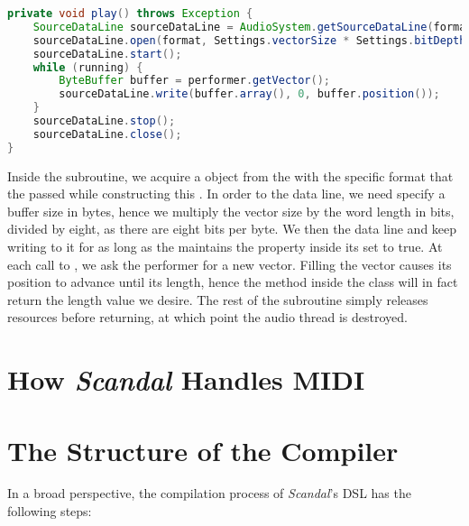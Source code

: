 \begin{lstlisting}[language=Java,caption={Writing buffers of audio data inside the \il{play} subroutine.},label={alg:play}]
private void play() throws Exception {
	SourceDataLine sourceDataLine = AudioSystem.getSourceDataLine(format);
	sourceDataLine.open(format, Settings.vectorSize * Settings.bitDepth / 8);
	sourceDataLine.start();
	while (running) {
		ByteBuffer buffer = performer.getVector();
		sourceDataLine.write(buffer.array(), 0, buffer.position());
	}
	sourceDataLine.stop();
	sourceDataLine.close();
}
\end{lstlisting}

Inside the  subroutine, we acquire a  object from the  with the specific format that the  passed while constructing this . In order to  the data line, we need specify a buffer size in bytes, hence we multiply the vector size by the word length in bits, divided by eight, as there are eight bits per byte. We then  the data line and keep writing to it for as long as the  maintains the  property inside its  set to true. At each call to , we ask the performer for a new vector. Filling the vector causes its position to advance until its length, hence the  method inside the  class will in fact return the length value we desire. The rest of the  subroutine simply releases resources before returning, at which point the audio thread is destroyed.

\section{How \emph{Scandal} Handles MIDI}

\section{The Structure of the Compiler}

In a broad perspective, the compilation process of \emph{Scandal}'s DSL has the following steps:

